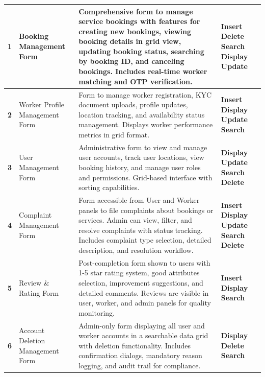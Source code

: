\documentclass[12pt,a4paper]{article}
\begin{document}
\begin{longtable}{|>{\centering\arraybackslash}p{1cm}|p{4.5cm}|p{5.5cm}|p{3.5cm}|}
\rowcolor{lightgray}
\textbf{1} & Booking Management Form & Comprehensive form to manage service bookings with features for creating new bookings, viewing booking details in grid view, updating booking status, searching by booking ID, and canceling bookings. Includes real-time worker matching and OTP verification. & \textbf{Insert} \newline \textbf{Delete} \newline \textbf{Search} \newline \textbf{Display} \newline \textbf{Update} \\
\hline
\textbf{2} & Worker Profile Management Form & Form to manage worker registration, KYC document uploads, profile updates, location tracking, and availability status management. Displays worker performance metrics in grid format. & \textbf{Insert} \newline \textbf{Display} \newline \textbf{Update} \newline \textbf{Search} \\
\hline
\rowcolor{lightgray}
\textbf{3} & User Management Form & Administrative form to view and manage user accounts, track user locations, view booking history, and manage user roles and permissions. Grid-based interface with sorting capabilities. & \textbf{Display} \newline \textbf{Update} \newline \textbf{Search} \newline \textbf{Delete} \\
\hline
\textbf{4} & Complaint Management Form & Form accessible from User and Worker panels to file complaints about bookings or services. Admin can view, filter, and resolve complaints with status tracking. Includes complaint type selection, detailed description, and resolution workflow. & \textbf{Insert} \newline \textbf{Display} \newline \textbf{Update} \newline \textbf{Search} \newline \textbf{Delete} \\
\hline
\rowcolor{lightgray}
\textbf{5} & Review \& Rating Form & Post-completion form shown to users with 1-5 star rating system, good attributes selection, improvement suggestions, and detailed comments. Reviews are visible in user, worker, and admin panels for quality monitoring. & \textbf{Insert} \newline \textbf{Display} \newline \textbf{Search} \\
\hline
\textbf{6} & Account Deletion Management Form & Admin-only form displaying all user and worker accounts in a searchable data grid with deletion functionality. Includes confirmation dialogs, mandatory reason logging, and audit trail for compliance. & \textbf{Display} \newline \textbf{Delete} \newline \textbf{Search} \\
\hline
\end{longtable}
\end{document}
